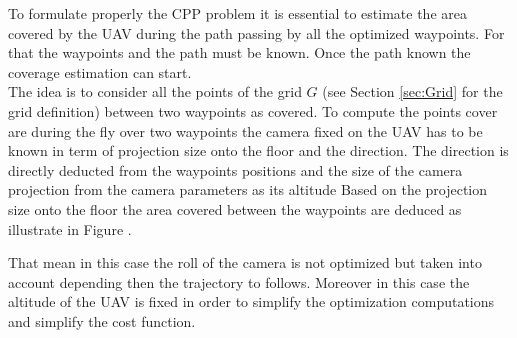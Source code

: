 To formulate properly the CPP problem it is essential to estimate the area covered by the UAV during the path passing by all the optimized waypoints. For that the waypoints and the path must be known. 
 Once the path known the coverage estimation can start. \\
 The idea is to consider all the points of the grid $G$ (see Section \ref{sec:Grid} for the grid definition) between two waypoints as covered. To compute the points cover are during the fly over two waypoints the camera fixed on the UAV has to be known in term of projection size onto the floor and the direction. %
  The direction is directly deducted from the waypoints positions and the size of the camera projection from the camera parameters as its altitude %
  Based on the projection size onto the floor the area covered between the waypoints are deduced as illustrate in Figure .

 
 That mean in this case the roll of the camera is not optimized but taken into account depending then the trajectory to follows. Moreover in this case the altitude of the UAV is fixed in order to simplify the optimization computations and simplify the cost function.


